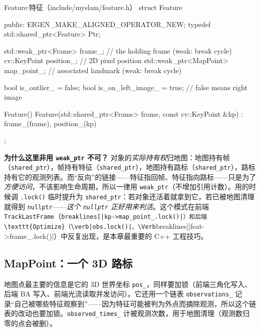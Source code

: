 \begin{codebox}[C++]{Feature:特征（include/myslam/feature.h）}
struct Feature {
   public:
    EIGEN_MAKE_ALIGNED_OPERATOR_NEW;
    typedef std::shared_ptr<Feature> Ptr;

    std::weak_ptr<Frame> frame_;          // the holding frame (weak: break cycle)
    cv::KeyPoint position_;               // 2D pixel position
    std::weak_ptr<MapPoint> map_point_;   // associated landmark (weak: break cycle)

    bool is_outlier_ = false;
    bool is_on_left_image_ = true;        // false means right image

    Feature() {}
    Feature(std::shared_ptr<Frame> frame, const cv::KeyPoint &kp)
        : frame_(frame), position_(kp) {}
};
\end{codebox}

\begin{insight}
\textbf{为什么这里非用 \texttt{weak\_ptr} 不可？}
对象的\emph{实际持有权}归地图：地图持有帧（\texttt{shared\_ptr}），帧持有特征（\texttt{shared\_ptr}），地图持有路标（\texttt{shared\_ptr}），路标持有它的观测列表。而“反向”的链接——特征指回帧、特征指向路标——只是为了\emph{方便访问}，不该影响生命周期，所以一律用 \texttt{weak\_ptr}（不增加引用计数）。用的时候调 \texttt{.lock()} 临时提升为 \texttt{shared\_ptr}：若对象还活着就拿到它，若已被地图清理就得到 \texttt{nullptr}——\emph{这个 \texttt{nullptr} 正好用来判活}。这个模式在前端 \texttt{TrackLastFrame}（\Verb[breaklines]|kp->map_point_.lock()|）和后端 \texttt{Optimize}（\verb|obs.lock()|、\Verb[breaklines]|feat->frame_.lock()|）中反复出现，是本章最重要的 C++ 工程技巧。
\end{insight}

\subsection{MapPoint：一个 3D 路标}
\label{sec:sys-mappoint}

地图点最主要的信息是它的 3D 世界坐标 \texttt{pos\_}，同样要加锁（前端三角化写入、后端 BA 写入、前端光流读取并发访问）。它还用一个链表 \texttt{observations\_} 记录“自己被哪些特征观察到”——因为特征可能被判为外点而摘除观测，所以这个链表的改动也要加锁。\texttt{observed\_times\_} 计被观测次数，用于地图清理（观测数归零的点会被删）。

